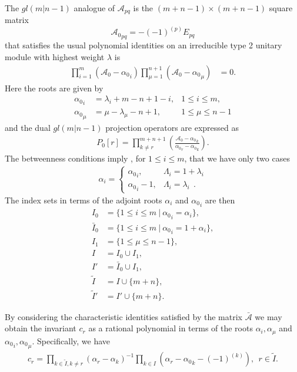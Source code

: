 \documentclass[12pt]{article}
\def\nn{\nonumber}
\begin{document}
~~\\
The $gl(m|n-1)$ analogue of ${\mathcal{A}}_{pq}$ is the $(m+n-1) \times (m+n-1)$ square matrix
$$
{\mathcal{A}_0}_{pq} = -(-1)^{(p)} E_{pq}
$$
that satisfies the usual polynomial identities on an irreducible type 2 unitary module with highest weight $\lambda$ is
\begin{align*}
	\prod^m_{i=1} (\mathcal{A}_0 - {\alpha_0}_i ) \prod^{n+1}_{\mu=1} (\mathcal{A}_0 - {\alpha_0}_\mu) &= 0 .
\end{align*}
Here the roots are given by
\begin{align*}
{\alpha_0}_i &= {\lambda}_i + m - n + 1 - i, &1\leq i\leq m, \\
{\alpha_0}_\mu &= \mu-{\lambda}_\mu - n + 1, &1\leq \mu \leq n - 1 
\end{align*}
and the dual $gl(m|n-1)$ projection operators are expressed as
\begin{align}
P_0[r] = \prod_{k\neq r}^{m+n+1}\left( 
\frac{\mathcal{A}_0-{\alpha_0}_k}
{{\alpha_0}_r-{\alpha_0}_k} \right).
\end{align}
The betweenness conditions imply 
\cite{GIW3}, for $1\leq i\leq m$, that we have only two cases
\begin{align}
\alpha_i = \left\{ \begin{array}{rl} {\alpha_0}_i,& \Lambda_i = 1+\lambda_i\\
                                    {\alpha_0}_i - 1,& \Lambda_i = \lambda_i  ~~.
\end{array} \right.
\nn
\end{align}
The index sets in terms of the adjoint roots $\alpha_i$ and ${\alpha_0}_i$ are then
\begin{align}
I_0 &=  \{ 1\leq i\leq m\ |\ {\alpha_0}_i=\alpha_i\},\nn\\
\bar{I}_0 &=  \{ 1\leq i\leq m\ |\ {\alpha_0}_i=1+\alpha_i\},\nn\\
I_1 &= \{ 1\leq\mu\leq n-1\},\nn\\
I &= I_0\cup I_1,\nn\\
I'&= \bar{I}_0\cup I_1,\nn\\
\tilde{I} &= I\cup \{m+n\},\nn\\
\tilde{I}' &= I'\cup \{m+n\}.
\label{DefIndexSets2} 
\end{align}

By considering the characteristic identities satisfied by the matrix $\bar{\mathcal{A}}$ we may obtain the invariant $c_r$ as a rational polynomial in terms of the roots $\alpha_i,\alpha_\mu$ and ${\alpha_0}_i,{\alpha_0}_\mu$. Specifically, we have \cite{GIW1}
\begin{align}
c_r = \prod_{k\in \tilde{I},k\neq r} \left(\alpha_r - \alpha_k \right)^{-1}\prod_{k\in
I} \left(\alpha_r - {\alpha_0}_k - (-1)^{(k)}\right),\ \ r\in \tilde{I} .
\label{seer}
\end{align}
\end{document}
